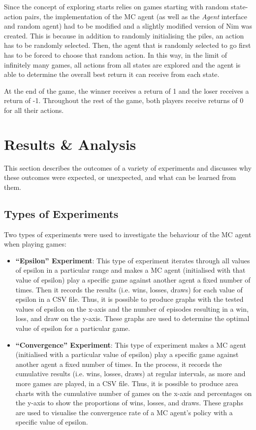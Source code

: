 \documentclass[11pt,a4paper]{report}
\begin{document}
Since the concept of exploring starts relies on games starting with random state-action pairs, the implementation of the MC agent (as well as the \emph{Agent} interface and random agent) had to be modified and a slightly modified version of Nim was created. This is because in addition to randomly initialising the piles, an action has to be randomly selected. Then, the agent that is randomly selected to go first has to be forced to choose that random action. In this way, in the limit of infinitely many games, all actions from all states are explored and the agent is able to determine the overall best return it can receive from each state.

At the end of the game, the winner receives a return of 1 and the loser receives a return of -1. Throughout the rest of the game, both players receive returns of 0 for all their actions.


\chapter{Results \& Analysis}

This section describes the outcomes of a variety of experiments and discusses why these outcomes were expected, or unexpected, and what can be learned from them.


\section{Types of Experiments}

Two types of experiments were used to investigate the behaviour of the MC agent when playing games:

\begin{itemize}

	\item \textbf{``Epsilon'' Experiment}: This type of experiment iterates through all values of epsilon in a particular range and makes a MC agent (initialised with that value of epsilon) play a specific game against another agent a fixed number of times. Then it records the results (i.e. wins, losses, draws) for each value of epsilon in a CSV file. Thus, it is possible to produce graphs with the tested values of epsilon on the x-axis and the number of episodes resulting in a win, loss, and draw on the y-axis. These graphs are used to determine the optimal value of epsilon for a particular game.

	\item \textbf{``Convergence'' Experiment}: This type of experiment makes a MC agent (initialised with a particular value of epsilon) play a specific game against another agent a fixed number of times. In the process, it records the cumulative results (i.e. wins, losses, draws) at regular intervals, as more and more games are played, in a CSV file. Thus, it is possible to produce area charts with the cumulative number of games on the x-axis and percentages on the y-axis to show the proportions of wins, losses, and draws. These graphs are used to visualise the convergence rate of a MC agent's policy with a specific value of epsilon.

\end{itemize}
\end{document}
